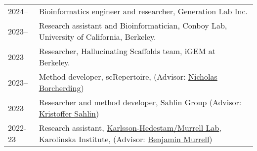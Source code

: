 
\begin{longtable}[l]{@{}p{} p{}}

    2024-- & Bioinformatics engineer and researcher, Generation Lab Inc. \\

    2023-- & Research assistant and Bioinformatician, Conboy Lab, University of California, Berkeley.\\

    2023 & Researcher, Hallucinating Scaffolds team, iGEM at Berkeley. \\

    2023-- & Method developer, scRepertoire, (Advisor: \href{https://www.borch.dev/}{Nicholas Borcherding})\\

    2023 & Researcher and method developer, Sahlin Group (Advisor: \href{https://www.scilifelab.se/researchers/kristoffer-sahlin/}{Kristoffer Sahlin}) \\

    2022-23 & Research assistant, \href{https://ki.se/en/people/benjamin-murrell}{Karlsson-Hedestam/Murrell Lab}, Karolinska Institute, (Advisor: \href{https://ki.se/en/people/benjamin-murrell}{Benjamin Murrell}) \\

\end{longtable}